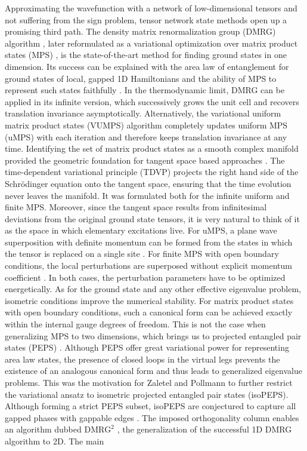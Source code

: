 Approximating the wavefunction with a network of low-dimensional tensors and not suffering from the sign problem, tensor network state methods open up a promising third path. The density matrix renormalization group (DMRG) algorithm \cite{white1992density}, later reformulated as a variational optimization over matrix product states (MPS) \cite{schollwock2011density}, is the state-of-the-art method for finding ground states in one dimension. Its success can be explained with the area law of entanglement \cite{hastings2007area} for ground states of local, gapped 1D Hamiltonians and the ability of MPS to represent such states faithfully \cite{verstraete2006matrix}. In the thermodynamic limit, DMRG can be applied in its infinite version, which successively grows the unit cell and recovers translation invariance asymptotically. Alternatively, the variational uniform matrix product states (VUMPS) algorithm \cite{zauner2018variational} completely updates uniform MPS (uMPS) with each iteration and therefore keeps translation invariance at any time. Identifying the set of matrix product states as a smooth complex manifold \cite{haegeman2014geometry} provided the geometric foundation for tangent space based approaches \cite{haegeman2013post}. The time-dependent variational principle (TDVP) projects the right hand side of the Schrödinger equation onto the tangent space, ensuring that the time evolution never leaves the manifold. It was formulated both for the infinite uniform \cite{haegeman2011time} and finite \cite{haegeman2016unifying} MPS. Moreover, since the tangent space results from infinitesimal deviations from the original ground state tensors, it is very natural to think of it as the space in which elementary excitations live. For uMPS, a plane wave superposition with definite momentum can be formed from the states in which the tensor is replaced on a single site \cite{haegeman2012variational, vanderstraeten2019tangent}. For finite MPS with open boundary conditions, the local perturbations are superposed without explicit momentum coefficient \cite{van2021efficient}. In both cases, the perturbation parameters have to be optimized energetically. As for the ground state and any other effective eigenvalue problem, isometric conditions improve the numerical stability. For matrix product states with open boundary conditions, such a canonical form can be achieved exactly within the internal gauge degrees of freedom. This is not the case when generalizing MPS to two dimensions, which brings us to projected entangled pair states (PEPS) \cite{verstraete2004renormalization}. Although PEPS offer great variational power for representing area law states, the presence of closed loops in the virtual legs prevents the existence of an analogous canonical form and thus leads to generalized eigenvalue problems. This was the motivation for Zaletel and Pollmann \cite{zaletel2020isometric} to further restrict the variational ansatz to isometric projected entangled pair states (isoPEPS). Although forming a strict PEPS subset, isoPEPS are conjectured to capture all gapped phases with gappable edges \cite{soejima2020isometric}. The imposed orthogonality column enables an algorithm dubbed $\text{DMRG}^{2}$ \cite{lin2022efficient}, the generalization of the successful 1D DMRG algorithm to 2D. The main 